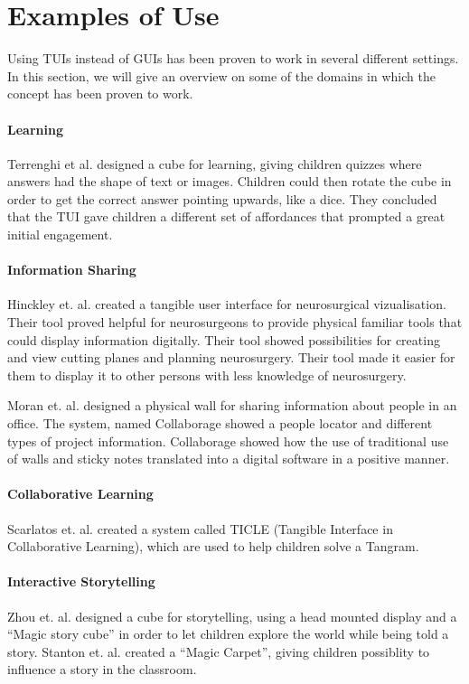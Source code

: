 \section{Examples of Use}
\label{sec:tuiexamples}
Using TUIs instead of GUIs has been proven to work in several different settings. In this section, we will give an overview on some of the domains in which the concept has been proven to work. 

\paragraph{Learning}
Terrenghi et al. designed a cube for learning, giving children quizzes where answers had the shape of text or images\cite{terrenghi2006cube}. Children could then rotate the cube in order to get the correct answer pointing upwards, like a dice. They concluded that the TUI gave children a different set of affordances that prompted a great initial engagement\cite{terrenghi2006cube}. 

\paragraph{Information Sharing}
Hinckley et. al. created a tangible user interface for neurosurgical vizualisation\cite{hinckley1994passive}. Their tool proved helpful for neurosurgeons to provide physical familiar tools that could display information digitally. Their tool showed possibilities for creating and view cutting planes and planning neurosurgery. Their tool made it easier for them to display it to other persons with less knowledge of neurosurgery. 

Moran et. al. designed a physical wall for sharing information about people in an office\cite{moran1999design}. The system, named Collaborage showed a people locator and different types of project information. Collaborage showed how the use of traditional use of walls and sticky notes translated into a digital software in a positive manner.


\paragraph{Collaborative Learning}
Scarlatos et. al. created a system called TICLE (Tangible Interface in Collaborative Learning), which are used to help children solve a Tangram\cite{scarlatos1999ticle}.  


\paragraph{Interactive Storytelling}
Zhou et. al. designed a cube for storytelling, using a head mounted display and a ``Magic story cube'' in order to let children explore the world while being told a story\cite{zhou2004magic}. Stanton et. al. created a ``Magic Carpet'', giving children possiblity to influence a story in the classroom\cite{stanton2001classroom}. 

